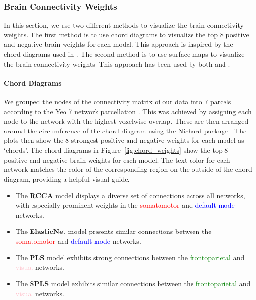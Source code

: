 \subsubsection{Brain Connectivity Weights}

In this section, we use two different methods to visualize the brain connectivity weights.
The first method is to use chord diagrams to visualize the top 8 positive and negative brain \gls{weights} for each model.
This approach is inspired by the chord diagrams used in \cite{smith2015positive}.
The second method is to use surface maps to visualize the brain connectivity weights.
This approach has been used by both \cite{ferreira2022hierarchical} and \cite{smith2015positive}.

\paragraph{Chord Diagrams}
We grouped the nodes of the connectivity matrix of our data into 7 parcels according to the Yeo 7 network parcellation \cite{yeo2011organization}.
This was achieved by assigning each node to the network with the highest voxelwise overlap.
These are then arranged around the circumference of the chord diagram using the Nichord package \citep{bogdan2023connsearch}.
The plots then show the 8 strongest positive and negative \gls{weights} for each model as `chords'.
The chord diagrams in Figure~\ref{fig:chord_weights} show the top 8 positive and negative brain \gls{weights} for each model. The text color for each network matches the color of the corresponding region on the outside of the chord diagram, providing a helpful visual guide.

\begin{itemize}
    \item The \textbf{RCCA} model displays a diverse set of connections across all networks, with especially prominent weights in the \textcolor{red}{somatomotor} and \textcolor{blue}{default mode} networks.

    \item The \textbf{ElasticNet} model presents similar connections between the \textcolor{red}{somatomotor} and \textcolor{blue}{default mode} networks.

    \item The \textbf{PLS} model exhibits strong connections between the \textcolor{green}{frontoparietal} and \textcolor{pink}{visual} networks.

    \item The \textbf{SPLS} model exhibits similar connections between the \textcolor{green}{frontoparietal} and \textcolor{pink}{visual} networks.
\end{itemize}

